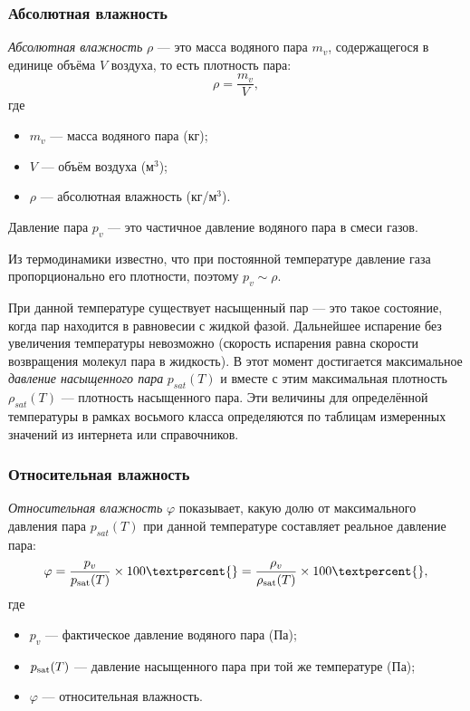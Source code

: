 \documentclass[12pt, a4paper]{article}%
\begin{document}
\subsubsection*{Абсолютная влажность}
\textit{Абсолютная влажность} $\rho$ — это масса водяного пара $m_v$, содержащегося в единице объёма $V$ воздуха, то есть плотность пара:
\[
\rho = \frac{m_v}{V},
\]
где
\begin{itemize}
  \item $m_v$ — масса водяного пара (кг);
  \item $V$ — объём воздуха (м$^3$);
  \item $\rho$ — абсолютная влажность (кг/м$^3$).
\end{itemize}

Давление пара $p_v$ — это частичное давление водяного пара в смеси газов. 

Из термодинамики известно, что при постоянной температуре давление газа пропорционально его плотности, поэтому $p_v \sim
 \rho$.

При данной температуре существует насыщенный пар — это такое состояние, когда пар находится в равновесии с жидкой фазой.
Дальнейшее испарение без увеличения температуры невозможно (скорость испарения равна скорости возвращения молекул пара в жидкость).
В этот момент достигается максимальное \textit{давление насыщенного пара} $p_{sat}(T)$ и вместе с этим максимальная плотность
$\rho_{sat}(T)$ --- плотность насыщенного пара. Эти величины для определённой температуры в рамках восьмого класса определяются по
таблицам измеренных значений из интернета или справочников.

\subsubsection*{Относительная влажность}

\textit{Относительная влажность} $\varphi$ показывает, какую долю от максимального давления пара $p_{sat}(T)$ при данной температуре составляет реальное давление пара:
\[
\varphi = \frac{p_v}{p_{\rm sat}(T)} \times 100\textpercent{ } = \frac{\rho_v}{\rho_{\rm sat}(T)} \times 100\textpercent{ } ,
\]
где
\begin{itemize}
  \item $p_v$ — фактическое давление водяного пара (Па);
  \item $p_{\rm sat}(T)$ — давление насыщенного пара при той же температуре (Па);
  \item $\varphi$ — относительная влажность.
\end{itemize}
\end{document}
